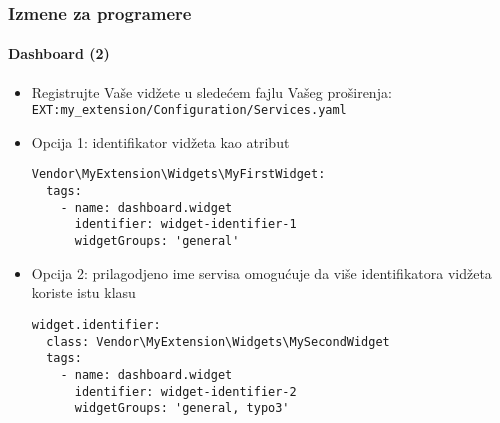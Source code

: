 
\begin{frame}[fragile]
	\frametitle{Izmene za programere}
	\framesubtitle{Dashboard (2)}

	\lstset{basicstyle=\tiny\ttfamily}

	\begin{itemize}
		\item Registrujte Vaše vidžete u sledećem fajlu Vašeg proširenja:\newline
			\texttt{EXT:my\_extension/Configuration/Services.yaml}

		\item Opcija 1: identifikator vidžeta kao atribut

\vspace{-0.4cm}
\begin{lstlisting}
Vendor\MyExtension\Widgets\MyFirstWidget:
  tags:
    - name: dashboard.widget
      identifier: widget-identifier-1
      widgetGroups: 'general'
\end{lstlisting}

		\item Opcija 2: prilagodjeno ime servisa omogućuje da više identifikatora vidžeta koriste istu klasu

\vspace{-0.4cm}
\begin{lstlisting}
widget.identifier:
  class: Vendor\MyExtension\Widgets\MySecondWidget
  tags:
    - name: dashboard.widget
      identifier: widget-identifier-2
      widgetGroups: 'general, typo3'
\end{lstlisting}

	\end{itemize}

\end{frame}


